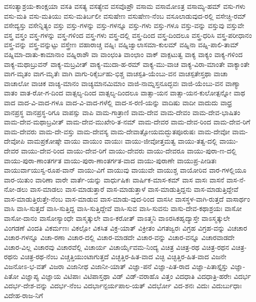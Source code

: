 {ವಸಂತ್ಯಾಶ್ರಯ-ಕಾಂಕ್ಷಯಾ
ವಸತಿ
ವಸತ್ಯ
ವಸತ್ಯೇವ
ವಸವೊಪ್ರೌ
ವಸಾಮ
ವಸಾಮೋಽತ್ರ
ವಸಾಮ್ಯ-ಹಮ್
ವಸು-ಗಳು
ವಸು-ಮತಿ
ವಸು-ಮತಿಯು
ವಸು-ಮತಿರ್ಬಲೀ
ವಸುಷೇಣ
ವಸುಷೇಣ-ನೆಂಬ
ವಸೂಲಾಡುವುದ-ರಲ್ಲಿ
ವಸೇಚ್ಚಿ-ರಮ್
ವಸೇದ್ಯಸ್ತು
ವಸೇನ್ನಿತ್ಯಂ
ವಸ್ತು
ವಸ್ತು-ಗಳನ್ನು
ವಸ್ತು-ಗಳನ್ನೂ
ವಸ್ತು-ಗಳು
ವಸ್ತು-ಗಳೂ
ವಸ್ತು-ವನ್ನು
ವಸ್ತುವು
ವಸ್ತುವೇ
ವಸ್ತ್ರ
ವಸ್ತ್ರಂ
ವಸ್ತ್ರ-ಗಳನ್ನು
ವಸ್ತ್ರ-ಗಳಿಂದ
ವಸ್ತ್ರ-ಗಳು
ವಸ್ತ್ರ-ದಲ್ಲಿ
ವಸ್ತ್ರ-ದಿಂದ
ವಸ್ತ್ರ-ದಿಂದಲೂ
ವಸ್ತ್ರ-ಧರಿಸಿ
ವಸ್ತ್ರ-ಪರೀಧಾನಂ
ವಸ್ತ್ರ-ವನ್ನು
ವಸ್ತ್ರ-ವನ್ನುಟ್ಟು
ವಸ್ತ್ರೇಣ
ವಹಾರಾಚ್ಚ
ವಹ್ನಿಃ
ವಹ್ನಿಜ್ವಾಲಾಸಮಾ-ಕುಲಮ್
ವಹ್ನಿನಾ
ವಹ್ನಿ-ಪಾಲಿ-ತಾಮ್
ವಹ್ನಿಮಾ-ದಾತು-ಕಾಮಾನಾಂ
ವಹ್ನಿರಾಶೌ
ವಾ
ವಾಂಛಂತಿ
ವಾಂಛಾಂ
ವಾಕ್
ವಾಕ್ಪಟುತ್ವ
ವಾಕ್ಯ
ವಾಕ್ಯಂ
ವಾಕ್ಯ-ಗಳಿಂದ
ವಾಕ್ಯ-ಮಥಾಬ್ರುವನ್
ವಾಕ್ಯ-ಮಬ್ರವೀತ್
ವಾಕ್ಯ-ಮುದಾ-ಹ-ರಮ್
ವಾಕ್ಯ-ಮು-ವಾಚ
ವಾಕ್ಯ-ವಿರಾ-ಮಾಂತೇ
ವಾಕ್ಯಾಂತೇ
ವಾಗ-ಮೃತಂ
ವಾಗ-ಮೃತೆಃ
ವಾಗಿ
ವಾಗು-ರಿಕೈರ್ಬಹು-ಭಿಶ್ಚ
ವಾಚಸ್ಪತಿ-ಯೆಂಬು-ವನ
ವಾಚಸ್ಪತೇಸ್ತಥಾ
ವಾಚಾ
ವಾಚಾಲೋ
ವಾಚಿಕ
ವಾಚ್ಯ-ಮಾನಂ
ವಾಚ್ಯಮಾನಮಿಮಾಂ
ವಾಜಿ-ನಾಮ್ನಸ್ತನೂದ್ಭವಃ
ವಾಜಿ-ಯೆಂಬು-ವನ
ವಾಣ್ಯಾ
ವಾತಂ
ವಾತ-ರೋ-ಗ-ದಿಂದ
ವಾತ್ಸಲ್ಯ-ದಿಂದ
ವಾತ್ಸಲ್ಯ-ದಿಂದಲೂ
ವಾತ್ಸಾ-ಯನ
ವಾತ್ಸಾ-ಯನ-ಕುಲೋತ್ಪನ್ನೋ
ವಾಥ
ವಾದ
ವಾದ-ವಿ-ವಾದ-ಗಳೂ
ವಾದ-ವಿ-ವಾದ-ಗಳೆಲ್ಲಿ
ವಾದ-ಸ-ರಣಿ-ಯನ್ನು
ವಾದಿಷು
ವಾದೀ
ವಾದುದು
ವಾಧ್ರ
ವಾನಪ್ರಸ್ಥ
ವಾನಪ್ರಸ್ಥ-ರಿಗೂ
ವಾಪಸ್ಸು
ವಾಪಿ
ವಾಮ-ಗಾತ್ರಾಣಿ
ವಾಮ-ದೇವ
ವಾಮ-ದೇವಂ
ವಾಮ-ದೇವ-ಭಾಷಿತಂ
ವಾಮ-ದೇವ-ಮಥಾಬ್ರವೀತ್
ವಾಮ-ದೇವ-ಮುಖೇರಿ-ತ-ನಮ್
ವಾಮ-ದೇವರ
ವಾಮ-ದೇವ-ರಿಂದ
ವಾಮ-ದೇವ-ರಿಗೆ
ವಾಮ-ದೇವರು
ವಾಮ-ದೇ-ವಸ್ತು
ವಾಮ-ದೇವಸ್ಯ
ವಾಮ-ದೇವಾತ್ಸೋಯಮದ್ಭುತಪೂರುಷಃ
ವಾಮ-ದೇವೋ
ವಾಮ-ದೇವೋಪಿ
ವಾಮಪ್ರಕೋಷ್ಠೇ
ವಾಯು
ವಾಯುಂ
ವಾಯುಃ
ವಾಯು-ಜೀವೋತ್ತಮತ್ವ
ವಾಯು-ತತ್ವ-ದಲ್ಲಿ
ವಾಯು-ದೇವರ
ವಾಯು-ದೇವ-ರಿಂದ
ವಾಯು-ದೇವ-ರಿಗೆ
ವಾಯು-ದೇವರು
ವಾಯು-ದೇವರೂ
ವಾಯು-ಪುರಾ-ಣ-ದಲ್ಲಿ
ವಾಯು-ಪುರಾ-ಣಾಂತರ್ಗತ
ವಾಯು-ಪುರಾ-ಣಾಂತರ್ಗತ-ವಾದ
ವಾಯು-ಪುರಾಣೇ
ವಾಯುಪ್ರ-ಪೀಡಿತಃ
ವಾಯುರ್ವಾಯುಸ್ವ-ರೂಪ-ವಾನ್
ವಾಯು-ವಿಗೆ
ವಾಯುವು
ವಾಯುವೇ
ವಾಯುಶ್ಚ
ವಾಯೋರಿವ
ವಾರ-ಗಳಲ್ಲಿಯೂ
ವಾರ-ಯಿತುಂ
ವಾರಿಣಾ
ವಾರೇ
ವಾರ್ತೆ-ಯನ್ನು
ವಾರ್ಧುಷಿಕಃ
ವಾರ್ಷಿಕ-ಮಾಸ-ಕಮ್
ವಾಸ
ವಾಸಃ
ವಾಸನೆ
ವಾಸ-ನೆ-ನೋ-ಡಲು
ವಾಸ-ಮಾಡಲು
ವಾಸ-ಮಾಡುತ್ತಾರೆ
ವಾಸ-ಮಾಡುತ್ತಾಳೆ
ವಾಸ-ಮಾಡುತ್ತಿದ್ದನು
ವಾಸ-ಮಾಡುತ್ತಿದ್ದೇವೆ
ವಾಸ-ಮಾಡುತ್ತಿರುತ್ತೇ-ನೆಂಬ
ವಾಸ-ಮಾಡುವ
ವಾಸ-ಮಾಡು-ವುದ-ರಿಂದ
ವಾಸಸೀ
ವಾಸಸ್ಥಳ-ವಾಗಿ-ರುತ್ತದೆ
ವಾಸಾರ್ಥಂ
ವಾಸಿ
ವಾಸಿ-ಸುತ್ತದೆ
ವಾಸಿ-ಸುತ್ತಿದ್ದ
ವಾಸಿ-ಸುತ್ತಿದ್ದೇವೆ
ವಾಸಿ-ಸುವ
ವಾಸಿ-ಸುವನು
ವಾಸು-ದೇವ-ಕಥಾಶ್ರಯಃ
ವಾಸೋ
ವಾಸೋ-ದಾನಂ
ವಾಸೋಸ್ಯಾಂಧೇ
ವಾಸ್ಮತ್ಕುಲೇ
ವಾಽ-ಕರೋತ್
ವಾಽತ್ಮನಿ
ವಾಽರಸಿಕಹೃದ್ಯಾಸ್ತೇ
ವಾಽಸ್ಮತ್ಕುಲೇ
ವಿಂಗಡಣೆ
ವಿಂದತಿ
ವಿಕರ್ಮಣಃ
ವಿಕಲ್ಪೋ
ವಿಕಸಿತ
ವಿಕ್ರ-ಯಾತ್
ವಿಕ್ರೀತಂ
ವಿಗತಜ್ವರಃ
ವಿಗ್ರಹ
ವಿಗ್ರಹ-ವನ್ನು
ವಿಚಚಾರ
ವಿಚಾರ-ಗಳನ್ನೂ
ವಿಚಾ-ರಣಾ
ವಿಚಾರ-ದಲ್ಲಿ
ವಿಚಾರ-ಮಾಡದೇ
ವಿಚಾರ-ವನ್ನು
ವಿಚಾರ-ವನ್ನೂ
ವಿಚಾರವಾಡದೇ
ವಿಚಾರ-ವಿಲ್ಲ
ವಿಚಾರವು
ವಿಚಾರವೆಲ್ಲಿ
ವಿಚಾರ್ಯ
ವಿಚಾರ್ಯೈವಮ-ನಿಂದ್ಯ
ವಿಚಿತ್ರ
ವಿಚಿತ್ರ-ರಥ
ವಿಚಿತ್ರ-ರಥನ
ವಿಚಿತ್ರ-ರಥನು
ವಿಚಿತ್ರ-ರಥ-ನೆಂಬ
ವಿಚ್ಚತ್ತಿಯುಂಟಾಗುತ್ತದೆ
ವಿಚ್ಛತ್ತಿರ-ಹಿತ-ವಾದ
ವಿಚ್ಛಿ
ವಿಚ್ಛಿತ್ತಿರ-ಹಿತ-ವಾದ
ವಿಜನೇ
ವಿಜನೋಽ-ಭ-ವತ್
ವಿಜರಾ
ವಿಜಾನೀಥ
ವಿಜಾನೀ-ಯಾತ್
ವಿಜ್ಞಾ-ಪನೆ
ವಿಜ್ಞಾ-ಪಿತ-ರಾದ
ವಿಜ್ಞಾ-ಪಿತಾಸ್ತೈಸ್ತು
ವಿಜ್ಞಾ-ಪಿತೋ
ವಿಜ್ಞಾಪ್ಯ
ವಿಜ್ಞಾಯ
ವಿಟಿಪಾಃ
ವಿಟಿಪಾಸ್ತಥಾ
ವಿಡ್
ವಿಡ್-ವರಾಹೊ
ವಿತ್ತಂ
ವಿದಧಾತಿ
ವಿದಧಾತ್ರಿ-ಹರೇಃ
ವಿದರ್ಭ
ವಿದರ್ಭ-ದೇಶ-ವನ್ನು
ವಿದರ್ಭ-ನೆಂಬ
ವಿದರ್ಭಾನ್ಪರ್ಯಪಾಲ-ಯತ್
ವಿದರ್ಭೋ
ವಿದ-ಶನಃ
ವಿದುಃ
ವಿದುರ್ಬುಧಾಃ
ವಿದೇಹ-ರಾಜ-ನಿಗೆ
}
